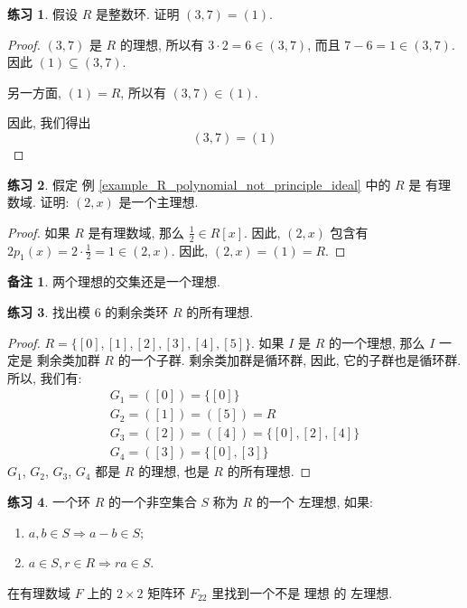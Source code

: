 \documentclass[utf8]{ctexbook}
\theoremstyle{definition}
\newtheorem{memo}{备注}[section]
\newtheorem{exercise}{练习}[section]
\begin{document}
\begin{exercise}
假设 $R$ 是整数环. 证明 $(3, 7) = (1)$.
\end{exercise}


\begin{proof}
$(3,7)$ 是 $R$ 的理想, 所以有 $3 \cdot 2 = 6 \in (3,7)$, 而且 $7 - 6 = 1 \in (3, 7)$. 因此 $(1) \subseteq (3,7)$.

另一方面, $(1) = R$, 所以有 $(3, 7) \in (1)$.

因此, 我们得出
\begin{equation}
(3, 7) = (1) \nonumber
\end{equation}

\end{proof}


\begin{exercise}\label{example_2_x_is_max_ideal}
假定 例 \ref{example_R_polynomial_not_principle_ideal} 中的 $R$ 是 有理数域. 证明: $(2,x)$ 是一个主理想.
\end{exercise}

\begin{proof}
如果 $R$ 是有理数域, 那么 $\frac{1}{2} \in R[x]$. 因此, $(2, x)$ 包含有 $2 p_1(x) = 2 \cdot \frac{1}{2} = 1 \in (2, x)$. 因此, $(2,x) = (1) = R$.
\end{proof}

\begin{memo}
两个理想的交集还是一个理想.
\end{memo}


\begin{exercise}
找出模 $6$ 的剩余类环 $R$ 的所有理想.
\end{exercise}

\begin{proof}
$R =\{[0], [1], [2], [3], [4], [5]  \}$. 如果 $I$ 是 $R$ 的一个理想, 那么 $I$ 一定是 剩余类加群 $R$ 的一个子群. 剩余类加群是循环群, 因此, 它的子群也是循环群. 所以, 我们有:
\begin{align*}
G_1 = ([0]) = \{ [0] \} \\
G_2 = ([1]) = ([5]) = R \\
G_3 = ([2]) = ([4]) = \{ [0], [2], [4] \} \\
G_4 = ([3]) = \{ [0], [3] \}
\end{align*}
$G_1$, $G_2$, $G_3$, $G_4$ 都是 $R$ 的理想, 也是 $R$ 的所有理想.
\end{proof}

\begin{exercise}
一个环 $R$ 的一个非空集合 $S$ 称为 $R$ 的一个 左理想, 如果:
\begin{enumerate}
\item{$a, b\in S \Longrightarrow a-b \in S$;}
\item{$a \in S, r \in R \Longrightarrow r a \in S$.}
\end{enumerate}

在有理数域 $F$ 上的 $2 \times 2$ 矩阵环 $F_{22}$ 里找到一个不是 理想 的 左理想.
\end{exercise}
\end{document}
